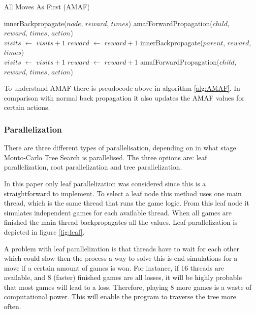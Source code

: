 \documentclass{ba-kecs}
\begin{document}
\begin{algorithm}
	\caption{All Moves As First (AMAF)}
	\label{alg:AMAF}
	\begin{algorithmic}
		\State innerBackpropagate($node$, $reward$, $times$)
		\State amafForwardPropagation($child$, $reward$, $times$, $action$)
		\EndFor\label{}
		\EndFunction \\
		
		\State $visits$ $\leftarrow$ $visits + 1$
		\State $reward$ $\leftarrow$ $reward + 1$
			\State innerBackpropagate($parent$, $reward$, $times$)
		\EndIf
		\EndFunction \\
		
			\State $visits$ $\leftarrow$ $visits + 1$
			\State $reward$ $\leftarrow$ $reward + 1$
		\Else
				\State amafForwardPropagation($child$, $reward$, $times$, $action$)
			\EndFor
		\EndIf
		\EndFunction
	\end{algorithmic}
\end{algorithm}
To understand AMAF there is pseudocode above in algorithm \ref{alg:AMAF}. In comparison with normal back propagation it also updates the AMAF values for certain actions.


\subsubsection{Parallelization}
There are three different types of parallelisation, depending on in what stage Monto-Carlo Tree Search is parallelised. The three options are: leaf parallelization, root parallelization and tree parallelization. 

In this paper only  leaf parallelization was considered since this is a straightforward to implement. To select a leaf node this method uses one main thread, which is the same thread that runs the game logic. From this leaf node it simulates independent games for each available thread. When all games are finished the main thread backpropagates all the values.\cite{chaslot2008parallel} Leaf parallelization is depicted in figure \ref{fig:leaf}.

A problem with leaf parallelization is that threads have to wait for each other which could slow then the process a way to solve this is end simulations for a move if a certain amount of games is won. For instance, if 16 threads are available, and 8 (faster) finished games are all losses, it will be highly probable that most games
will lead to a loss. Therefore, playing 8 more games is a waste of computational power. This will enable the program to traverse the tree more often.\cite{chaslot2008parallel}
\end{document}
